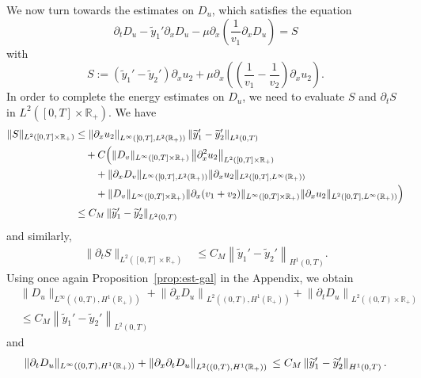 \documentclass[10pt]{amsart}
\theoremstyle{definition}\newtheorem{defi}[theo]{Definition}\newtheorem{rema}[theo]{Remark}\newtheorem{exam}[theo]{Example}\newtheorem{exem}[theo]{Example}\newtheorem{nota}[theo]{Notation}
\newcommand{\R}{\mathbb{R}}
\newcommand{\p}{\partial}
\newcommand{\ty}{\widetilde{y}}
\newcommand{\dv}{D_v}
\newcommand{\du}{D_u}
\begin{document}
We now turn towards the estimates on $\du$, which satisfies the equation
\[
\p_t \du - \ty_1'\p_x \du -\mu \p_x \left(\frac{1}{v_1}\p_x \du\right)= S
\]
with
\[
S:=\left(\ty_1'-\ty_2'\right)\p_x u_2 + \mu \p_x \left(\left(\frac{1}{v_1}- \frac{1}{v_2}\right) \p_x u_2\right).
\]
In order to complete the energy estimates on $\du$, we need to evaluate $S$ and $\p_t S$ in $L^2([0,T]\times \R_+)$. We have
\begin{align*}
\|S\|_{L^2\left([0,T]\times \R_+\right)} &\leq \left\|\p_x u_2\right\|_{L^\infty \left([0,T],L^2(\R_+)\right)}\left\|\ty_1'-\ty_2'\right\|_{L^2(0,T)}\\
&\quad + C \Big(\|\dv\|_{L^\infty\left([0,T]\times \R_+\right)}\left\|\p_{x}^2 u_2\right\|_{L^2\left([0,T]\times \R_+\right)} \\
& \hskip7mm+ \|\partial_x\dv\|_{L^\infty([0,T],L^2(\R_+))}\|\p_x u_2\|_{L^2([0,T],L^\infty(\R_+))} \\
& \hskip7mm + \|\dv\|_{L^\infty([0,T]\times \R_+)} \|\partial_x(v_1 + v_2)\|_{L^\infty([0,T]\times \R_+)} \|\p_x u_2\|_{L^2([0,T],L^\infty(\R_+))}\Big) \\
&\leq C_M \left\|\ty_1'-\ty_2'\right\|_{L^2(0,T)}
\end{align*}
and similarly,
\begin{align*}
\|\p_t S\|_{L^2([0,T]\times \R_+)} &\leq C_M \left\|\ty_1'-\ty_2'\right\|_{H^1(0,T)}.
\end{align*}
Using once again Proposition~\ref{prop:est-gal} in the Appendix, we obtain
\begin{align*}
&\|\du\|_{L^\infty\left((0,T), H^1(\R_+)\right)} + \left\|\p_x \du\right\|_{L^2\left((0,T),H^1(\R_+)\right)} + \left\|\p_t \du\right\|_{L^2\left((0,T)\times \R_+\right)}\\
& \leq C_M \left\|\ty_1'-\ty_2'\right\|_{L^2(0,T)}
\end{align*}
and
\[
\|\p_t \du\|_{L^\infty\left((0,T), H^1(\R_+)\right)} + \left\|\p_x\p_t \du\right\|_{L^2\left((0,T), H^1(\R_+)\right)}\\
\leq C_M \left\|\ty_1'-\ty_2'\right\|_{H^1(0,T)}.
\]
\end{document}
